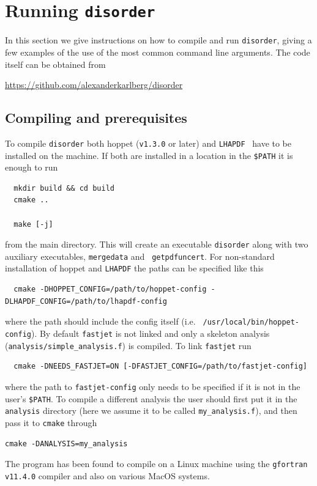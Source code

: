 \documentclass[submission, PhysCodeb]{SciPost}
\newcommand{\hoppet}{{\sc hoppet}}
\newcommand{\disorder}{{\tt disorder}}
\newcommand{\fastjet}{{\tt fastjet}}
\newcommand{\lhapdf}{{\tt LHAPDF}}
\begin{document}
\section{Running \disorder{}}
\label{sec:running}
In this section we give instructions on how to compile and run
\disorder{}, giving a few examples of the use of the most common
command line arguments. The code itself can be obtained from

\begin{center}\url{https://github.com/alexanderkarlberg/disorder}\end{center}

\subsection{Compiling and prerequisites}
To compile \disorder{} both \hoppet{} ({\tt v1.3.0} or later) and
\lhapdf{}~\cite{Buckley:2014ana} have to be installed on the
machine. If both are installed in a location in the {\tt \$PATH} it is
enough to run
\begin{lstlisting}
  mkdir build && cd build
  cmake ..

  make [-j]
\end{lstlisting}
from the main directory. This will create an executable \disorder{}
along with two auxiliary executables, {\tt mergedata} and {\tt
  getpdfuncert}. For non-standard installation of \hoppet{} and
\lhapdf{} the paths can be specified like this
\begin{lstlisting}
  cmake -DHOPPET_CONFIG=/path/to/hoppet-config -DLHAPDF_CONFIG=/path/to/lhapdf-config
\end{lstlisting}
where the path should include the config itself (i.e. {\tt
  /usr/local/bin/hoppet-config}). By default \fastjet{} is not linked
and only a skeleton analysis ({\tt analysis/simple\_analysis.f}) is
compiled. To link \fastjet{} run
\begin{lstlisting}
  cmake -DNEEDS_FASTJET=ON [-DFASTJET_CONFIG=/path/to/fastjet-config]
\end{lstlisting}
where the path to {\tt fastjet-config} only needs to be specified if
it is not in the user's {\tt \$PATH}. To compile a different analysis
the user should first put it in the {\tt analysis} directory (here we
assume it to be called {\tt my\_analysis.f}), and then pass it to
{\tt cmake} through
\begin{lstlisting}
cmake -DANALYSIS=my_analysis
\end{lstlisting}
The program has been found to compile on a Linux machine using the
{\tt gfortran v11.4.0} compiler and also on various MacOS systems.
\end{document}

